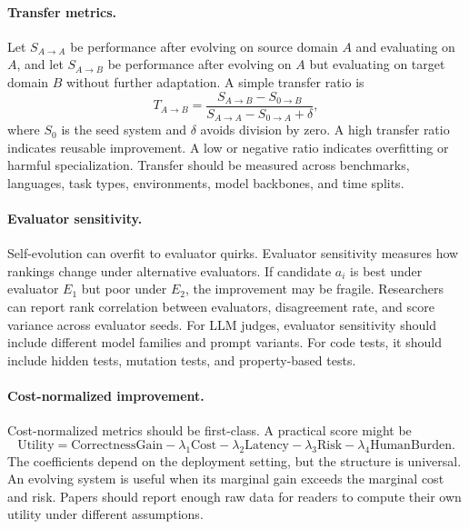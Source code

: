 \paragraph{Transfer metrics.}
Let $S_{A\rightarrow A}$ be performance after evolving on source domain $A$ and evaluating on $A$, and let $S_{A\rightarrow B}$ be performance after evolving on $A$ but evaluating on target domain $B$ without further adaptation. A simple transfer ratio is
\begin{equation}
T_{A\rightarrow B}=\frac{S_{A\rightarrow B}-S_{0\rightarrow B}}{S_{A\rightarrow A}-S_{0\rightarrow A}+\delta},
\end{equation}
where $S_0$ is the seed system and $\delta$ avoids division by zero. A high transfer ratio indicates reusable improvement. A low or negative ratio indicates overfitting or harmful specialization. Transfer should be measured across benchmarks, languages, task types, environments, model backbones, and time splits.

\paragraph{Evaluator sensitivity.}
Self-evolution can overfit to evaluator quirks. Evaluator sensitivity measures how rankings change under alternative evaluators. If candidate $a_i$ is best under evaluator $E_1$ but poor under $E_2$, the improvement may be fragile. Researchers can report rank correlation between evaluators, disagreement rate, and score variance across evaluator seeds. For LLM judges, evaluator sensitivity should include different model families and prompt variants. For code tests, it should include hidden tests, mutation tests, and property-based tests.

\paragraph{Cost-normalized improvement.}
Cost-normalized metrics should be first-class. A practical score might be
\begin{equation}
\mathrm{Utility}=\mathrm{CorrectnessGain}-\lambda_1\mathrm{Cost}-\lambda_2\mathrm{Latency}-\lambda_3\mathrm{Risk}-\lambda_4\mathrm{HumanBurden}.
\end{equation}
The coefficients depend on the deployment setting, but the structure is universal. An evolving system is useful when its marginal gain exceeds the marginal cost and risk. Papers should report enough raw data for readers to compute their own utility under different assumptions.

